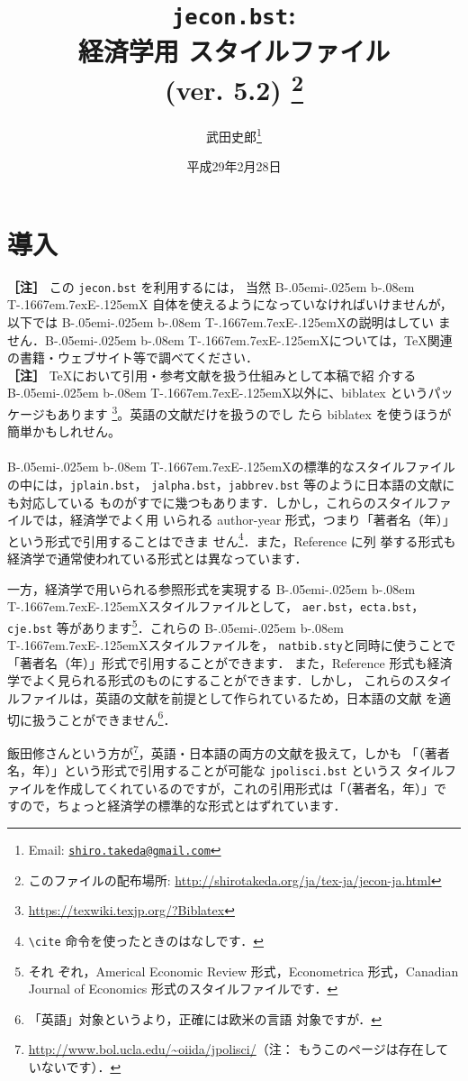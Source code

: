 \documentclass[a4j,10pt]{jarticle}
\title{\texttt{jecon.bst}:\\ 経済学用 \BibTeX{} スタイルファイル\\ (ver. 5.2)
\thanks{このファイルの配布場所: \url{http://shirotakeda.org/ja/tex-ja/jecon-ja.html}}
}
\author{武田史郎\thanks{Email: \texttt{\href{mailto:shiro.takeda@gmail.com}{shiro.takeda@gmail.com}}}}
\date{平成29年2月28日}
\def\BibTeX{{\rm B\kern-.05em{\sc i\kern-.025em b}\kern-.08em
    T\kern-.1667em\lower.7ex\hbox{E}\kern-.125emX}}
\begin{document}
\maketitle

\tableofcontents


\section{導入}

\noindent \textbf{［注］} この \texttt{jecon.bst} を利用するには， 当然 \BibTeX
自体を使えるようになっていなければいけませんが，以下では \BibTeX の説明はしてい
ません．\BibTeX については，\TeX 関連の書籍・ウェブサイト等で調べてください．\\

\noindent \textbf{［注］} \TeX において引用・参考文献を扱う仕組みとして本稿で紹
介する \BibTeX 以外に、biblatex というパッケージもあります
\footnote{\url{https://texwiki.texjp.org/?Biblatex}}。英語の文献だけを扱うのでし
たら biblatex を使うほうが簡単かもしれせん。
\\
\\

\BibTeX の標準的なスタイルファイルの中には，\texttt{jplain.bst}，
\texttt{jalpha.bst}，\texttt{jabbrev.bst} 等のように日本語の文献にも対応している
ものがすでに幾つもあります．しかし，これらのスタイルファイルでは，経済学でよく用
いられる author-year 形式，つまり「著者名（年）」という形式で引用することはできま
せん\footnote{\verb|\cite| 命令を使ったときのはなしです．}．また，Reference に列
挙する形式も経済学で通常使われている形式とは異なっています．

一方，経済学で用いられる参照形式を実現する \BibTeX スタイルファイルとして，
\texttt{aer.bst}，\texttt{ecta.bst}，\texttt{cje.bst} 等があります\footnote{それ
ぞれ，Americal Economic Review 形式，Econometrica 形式，Canadian Journal of
Economics 形式のスタイルファイルです．}．これらの \BibTeX スタイルファイルを，
\texttt{natbib.sty}と同時に使うことで「著者名（年）」形式で引用することができます．
また，Reference 形式も経済学でよく見られる形式のものにすることができます．しかし，
これらのスタイルファイルは，英語の文献を前提として作られているため，日本語の文献
を適切に扱うことができません\footnote{「英語」対象というより，正確には欧米の言語
対象ですが．}．

飯田修さんという方が\footnote{\url{http://www.bol.ucla.edu/~oiida/jpolisci/}（注：
もうこのページは存在していないです）．}，英語・日本語の両方の文献を扱えて，しかも
「（著者名，年）」という形式で引用することが可能な \texttt{jpolisci.bst} というス
タイルファイルを作成してくれているのですが，これの引用形式は「（著者名，年）」で
すので，ちょっと経済学の標準的な形式とはずれています．
\end{document}
